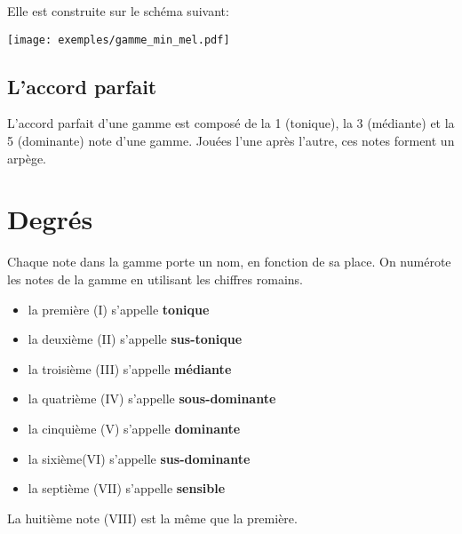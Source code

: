 Elle est construite sur le schéma suivant: 
\begin{center}
\end{center}
\begin{center}
\texttt{[image: exemples/gamme\_min\_mel.pdf]}
\end{center}


\subsection{L'accord parfait}
L'accord parfait d'une gamme est composé de la 1\iere{} (tonique), la 3\ieme{} (médiante) et la 5\ieme{} (dominante) note d'une gamme. Jouées l'une après l'autre, ces notes forment un arpège.


\section{Degrés}
Chaque note dans la gamme porte un nom, en fonction de sa place. On numérote les notes de la gamme en utilisant les chiffres romains.
\begin{itemize}
\item la première (I) s'appelle \textbf{tonique}
\item la deuxième (II) s'appelle \textbf{sus-tonique}
\item la troisième (III) s'appelle \textbf{médiante}
\item la quatrième (IV) s'appelle \textbf{sous-dominante}
\item la cinquième (V) s'appelle \textbf{dominante}
\item la sixième(VI) s'appelle \textbf{sus-dominante}
\item la septième (VII) s'appelle \textbf{sensible}
\end{itemize}
La huitième note (VIII) est la même que la première.


